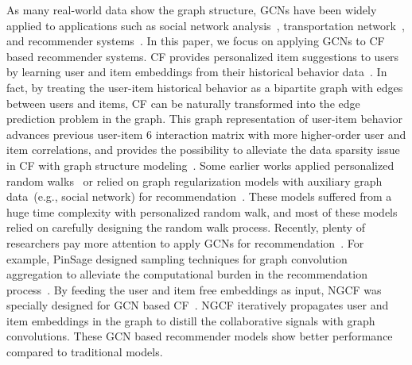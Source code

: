 \documentclass[letterpaper]{article} %
\begin{document}
    
As many real-world data show the graph structure, GCNs have been widely applied to applications such as social network analysis~\cite{xu2019relation}, transportation network~\cite{zhao2019t}, and recommender systems~\cite{kdd2018GCMC}. In this paper, we focus on applying GCNs to CF based recommender systems. CF provides personalized item suggestions to users by learning user and item embeddings from their historical behavior data~\cite{UAI2009bpr,WWW2017neural}. In fact, by treating the user-item historical behavior as a bipartite graph with edges between users and items, CF can be naturally transformed into the edge prediction problem in the graph. This graph representation of user-item behavior advances previous user-item 
6
 interaction matrix with more higher-order user and item correlations, and provides the possibility to alleviate the data sparsity issue in CF with graph structure modeling~\cite{sigir2019ngcf,kdd2018GCMC,kdd2018Pinsage}. Some earlier works applied personalized random walks~\cite{SIGIR2008eigenrank} or relied on graph regularization models with auxiliary graph data~(e.g., social network) for recommendation~\cite{SDM2010collaborative,huang2004graph}. These models suffered from a huge time complexity with personalized random walk, and most of these models relied on carefully designing the random walk process. Recently, plenty of researchers pay more attention  to apply  
GCNs for recommendation~\cite{kdir18,sigir2019ngcf,kdd2018GCMC,kdd2018Pinsage}. For example, PinSage designed sampling techniques for graph convolution aggregation to alleviate the computational burden in the recommendation process~\cite{kdd2018Pinsage}. By feeding the user and item free embeddings as input, NGCF was specially designed for GCN based CF~\cite{sigir2019ngcf}. NGCF iteratively propagates user and item embeddings in the graph to distill the collaborative signals with graph convolutions.
These GCN based recommender models show better performance compared to traditional models.

 
\end{document}
